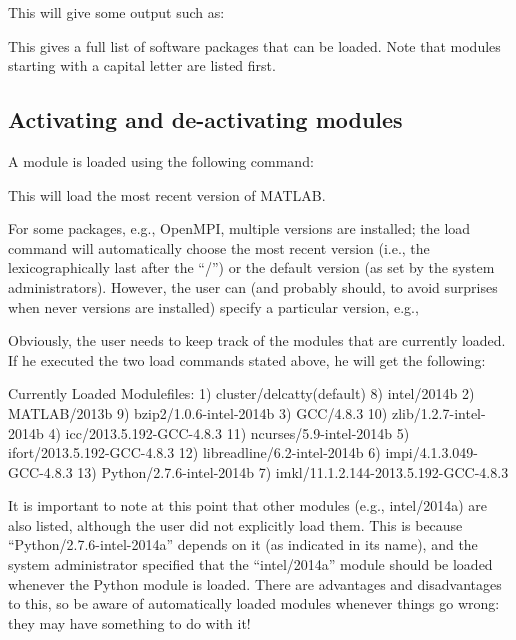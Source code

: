 This will give some output such as:


This gives a full list of software packages that can be loaded. Note that
modules starting with a capital letter are listed first.

\subsection{Activating and de-activating modules}

A module is loaded using the following command:

\begin{prompt}
\end{prompt}

This will load the most recent version of MATLAB.

For some packages, e.g., OpenMPI, multiple versions are installed; the load
command will automatically choose the most recent version (i.e., the
lexicographically last after the ``/'') or the default version (as set by the
system administrators). However, the user can (and probably should, to avoid
surprises when never versions are installed) specify a particular version,
e.g.,

\begin{prompt}
\end{prompt}

Obviously, the user needs to keep track of the modules that are currently
loaded. If he executed the two load commands stated above, he will get the
following:

\begin{prompt}
Currently Loaded Modulefiles:
  1) cluster/delcatty(default)              8) intel/2014b
  2) MATLAB/2013b                           9) bzip2/1.0.6-intel-2014b
  3) GCC/4.8.3                             10) zlib/1.2.7-intel-2014b
  4) icc/2013.5.192-GCC-4.8.3              11) ncurses/5.9-intel-2014b
  5) ifort/2013.5.192-GCC-4.8.3            12) libreadline/6.2-intel-2014b
  6) impi/4.1.3.049-GCC-4.8.3              13) Python/2.7.6-intel-2014b
  7) imkl/11.1.2.144-2013.5.192-GCC-4.8.3
\end{prompt}

It is important to note at this point that other modules (e.g., intel/2014a)
are also listed, although the user did not explicitly load them. This is
because ``Python/2.7.6-intel-2014a'' depends on it (as indicated in its name),
and the system administrator specified that the ``intel/2014a'' module should
be loaded whenever the Python module is loaded. There are advantages and
disadvantages to this, so be aware of automatically loaded modules whenever
things go wrong: they may have something to do with it!

